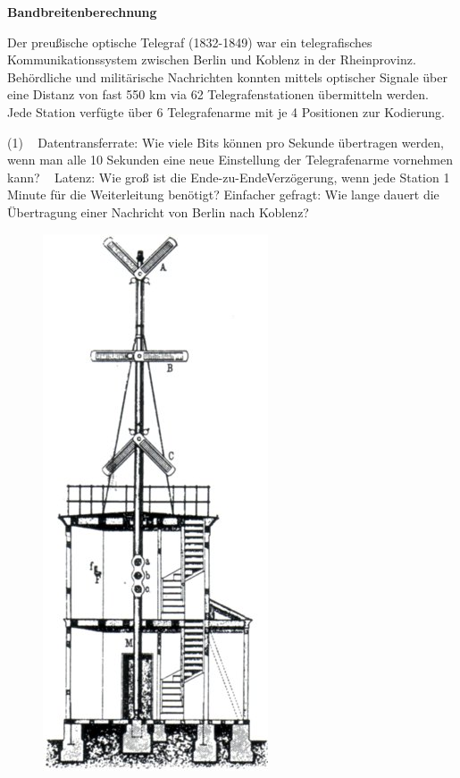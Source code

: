 \documentclass[paper=a4,fontsize=11pt]{scrartcl}%
\numberwithin{equation}{section}
\begin{document}
{\begin{enumerate}
\end{enumerate}

\begin{center}\Large{\textbf{Bandbreitenberechnung}}\end{center}\vskip0.25in

\begin{enumerate}
\begin{minipage}{0.7\textwidth}
\item Der preußische optische Telegraf (1832-1849) war ein telegrafisches Kommunikationssystem zwischen Berlin und Koblenz in der Rheinprovinz.\\
Behördliche und militärische Nachrichten konnten mittels optischer Signale über eine Distanz von fast 550 km via 62 Telegrafenstationen übermitteln werden.\\
Jede Station verfügte über 6 Telegrafenarme mit je 4 Positionen zur Kodierung.
\begin{tasks}(1)
	\task~ Datentransferrate: Wie viele Bits können pro Sekunde übertragen werden, wenn man alle 10 Sekunden eine neue Einstellung der Telegrafenarme vornehmen kann?
	\task~ Latenz: Wie groß ist die Ende-zu-EndeVerzögerung, wenn jede Station 1 Minute für die Weiterleitung benötigt? Einfacher gefragt: Wie lange dauert die Übertragung einer Nachricht von Berlin nach Koblenz?
\end{tasks}
\end{minipage}%
\begin{minipage}{0.3\textwidth}
\begin{figure}[H]
\includegraphics[scale=0.5]{telegraph}
\end{figure}
\end{minipage} \hfill


\end{enumerate}}
\end{document}
